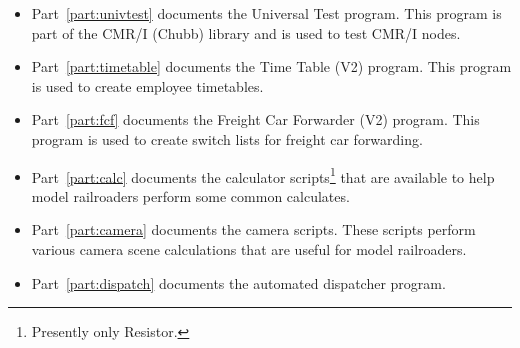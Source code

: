 \begin{itemize}
\item Part~\ref{part:univtest} documents the Universal Test program. This
program is part of the CMR/I (Chubb) library and is used to test CMR/I
nodes.
\item Part~\ref{part:timetable} documents the Time Table (V2) program.
This program is used to create employee timetables.
\item Part~\ref{part:fcf} documents the Freight Car Forwarder (V2)
program. This program is used to create switch lists for freight car
forwarding.
\item Part~\ref{part:calc} documents the calculator
scripts\footnote{Presently only Resistor.} that are available to help
model railroaders perform some common calculates.
\item Part~\ref{part:camera} documents the camera scripts.  These
scripts perform various camera scene calculations that are useful for
model railroaders.
\item Part~\ref{part:dispatch} documents the automated dispatcher program.
\end{itemize}
